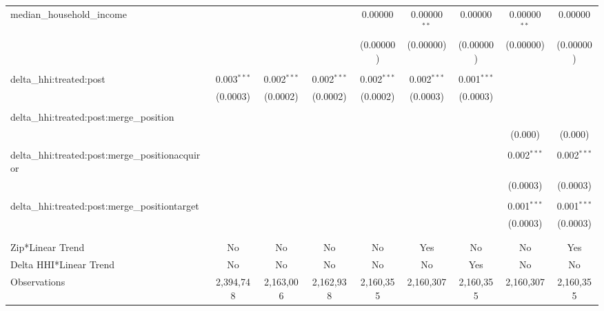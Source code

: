 \begin{table}[H]
{\begin{tabular}{@{\extracolsep{5pt}}lcccccccc}
  median\_household\_income &  &  &  & 0.00000 & 0.00000$^{**}$ & 0.00000 & 0.00000$^{**}$ & 0.00000 \\  

   &  &  &  & (0.00000) & (0.00000) & (0.00000) & (0.00000) & (0.00000) \\  

   & & & & & & & & \\  

  delta\_hhi:treated:post & 0.003$^{***}$ & 0.002$^{***}$ & 0.002$^{***}$ & 0.002$^{***}$ & 0.002$^{***}$ & 0.001$^{***}$ &  &  \\  

   & (0.0003) & (0.0002) & (0.0002) & (0.0002) & (0.0003) & (0.0003) &  &  \\  

   & & & & & & & & \\  

  delta\_hhi:treated:post:merge\_position &  &  &  &  &  &  &  &  \\  

   &  &  &  &  &  &  & (0.000) & (0.000) \\  

   & & & & & & & & \\  

  delta\_hhi:treated:post:merge\_positionacquiror &  &  &  &  &  &  & 0.002$^{***}$ & 0.002$^{***}$ \\  

   &  &  &  &  &  &  & (0.0003) & (0.0003) \\  

   & & & & & & & & \\  

  delta\_hhi:treated:post:merge\_positiontarget &  &  &  &  &  &  & 0.001$^{***}$ & 0.001$^{***}$ \\  

   &  &  &  &  &  &  & (0.0003) & (0.0003) \\  

   & & & & & & & & \\  

 \hline \\[-1.8ex]  

 Zip*Linear Trend & No & No & No & No & Yes & No & No & Yes \\  

 Delta HHI*Linear Trend & No & No & No & No & No & Yes & No & No \\  

 Observations & 2,394,748 & 2,163,006 & 2,162,938 & 2,160,355 & 2,160,307 & 2,160,355 & 2,160,307 & 2,160,355 \\  


\end{tabular}}
\end{table}
